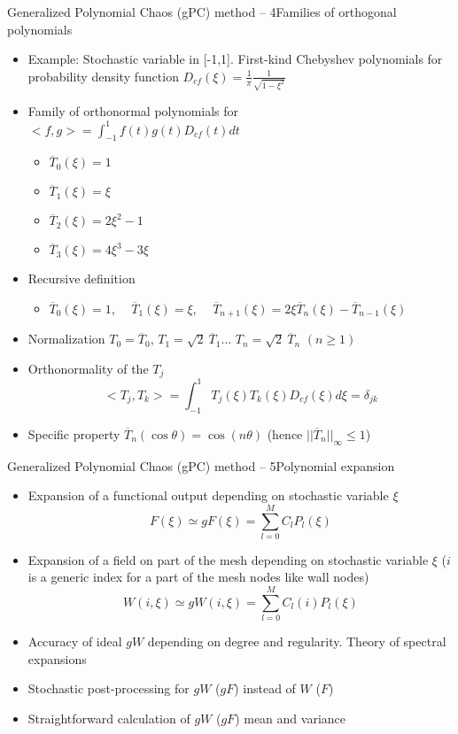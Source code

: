 \documentclass[10pt]{beamer}
\def\vo{\vspace{1mm}}
\def\vt{\vspace{2mm}}
\def\vf{\vspace{4mm}}
\def\begit{\begin{itemize}}
\def\endit{\end{itemize}}
\begin{document}
%
%
\begin{frame}{Generalized Polynomial Chaos (gPC) method -- 4}{Families of orthogonal polynomials}

\footnotesize{
\begit
 \item Example: Stochastic variable in [-1,1].  First-kind Chebyshev polynomials for probability density function
 $D_{cf}(\xi)=\frac{1}{\pi} \frac{1}{\sqrt{1-\xi^2}} $
% 
 \item Family of orthonormal polynomials for $<f,g>=\int_{-1}^{1}f(t)g(t)D_{cf}(t)dt $
     \begit
     \item $\overline{T}_0(\xi)=1 $
     \item $\overline{T}_1(\xi)=\xi$
     \item $\overline{T}_2(\xi)=2\xi^2-1$
     \item $\overline{T}_3(\xi)=4\xi^3-3\xi$
     \endit
 \item Recursive definition
    \begit
    \item  $\overline{T}_0(\xi)=1$, $\quad\overline{T}_1(\xi)=\xi$, $\quad\overline{T}_{n+1}(\xi) = 2\xi \overline{T}_{n}(\xi) - \overline{T}_{n-1}(\xi)$
    \endit
 \vo
 \item Normalization $ T_0 = \overline{T}_0$, $T_1=\sqrt{2}~ \overline{T}_1$... $T_n=\sqrt{2}~ \overline{T}_n$ $(n \geq 1)$
 \vo
 \item Orthonormality of the $T_j$
 $$<T_j,T_k> = \int_{-1}^{1}T_j(\xi)T_k(\xi)D_{cf}(\xi)d\xi = \delta_{jk}$$
 \item Specific property $\overline{T}_n(\cos\theta)=\cos(n\theta)$ (hence $\vert\vert \overline{T}_n \vert \vert_\infty \leq 1$) 
\endit
}
\end{frame}
%
%
\begin{frame}{Generalized Polynomial Chaos (gPC) method -- 5}{Polynomial expansion }

\footnotesize{
\begit

\item Expansion of a functional output depending on stochastic variable $\xi$ 
 $$ F(\xi) \simeq gF(\xi) = \sum_{l=0}^{M} C_l P_l(\xi)$$
\item Expansion of a field on part of the mesh depending on stochastic variable $\xi$ 
 ($i$ is a generic index for a part of the mesh nodes like wall nodes)
 $$ W(i,\xi) \simeq gW(i,\xi) = \sum_{l=0}^{M} C_l(i) P_l(\xi)$$
%
\item Accuracy of ideal $gW$ depending on degree and regularity. Theory of spectral expansions   
\vf
\item Stochastic post-processing for $gW$ ($gF$) instead of $W$ ($F$) 
\item Straightforward calculation of $gW$ ($gF$) mean and variance 

\endit
}
\end{frame} 
\end{document}
